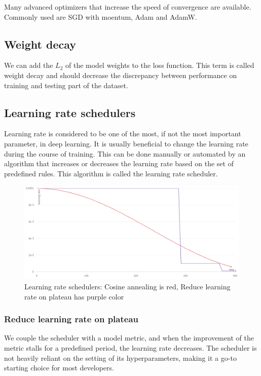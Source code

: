 Many advanced optimizers that increase the speed of convergence are available. Commonly used are SGD with moentum, Adam and AdamW.

\subsection{Weight decay}
We can add the $L_2$ of the model weights to the loss function. This term is called weight decay and should decrease the discrepancy between performance on training and testing part of the dataset.

\subsection{Learning rate schedulers}
Learning rate is considered to be one of the most, if not the most important parameter, in deep learning. It is usually beneficial to change the learning rate during the course of training. This can be done manually or automated by an algorithm that increases or decreases the learning rate based on the set of predefined rules. This algorithm is called the learning rate scheduler.
\begin{figure}
    \centering
    \includegraphics[width=0.5\linewidth]{images/schedulers.png}
    \caption{Learning rate schedulers: Cosine annealing is red, Reduce learning rate on plateau has purple color}
    \label{fig:schedulers}
\end{figure}

\subsubsection{Reduce learning rate on plateau}
We couple the scheduler with a model metric, and when the improvement of the metric stalls for a predefined period, the learning rate decreases.
The scheduler is not heavily reliant on the setting of its hyperparameters, making it a go-to starting choice for most developers.


